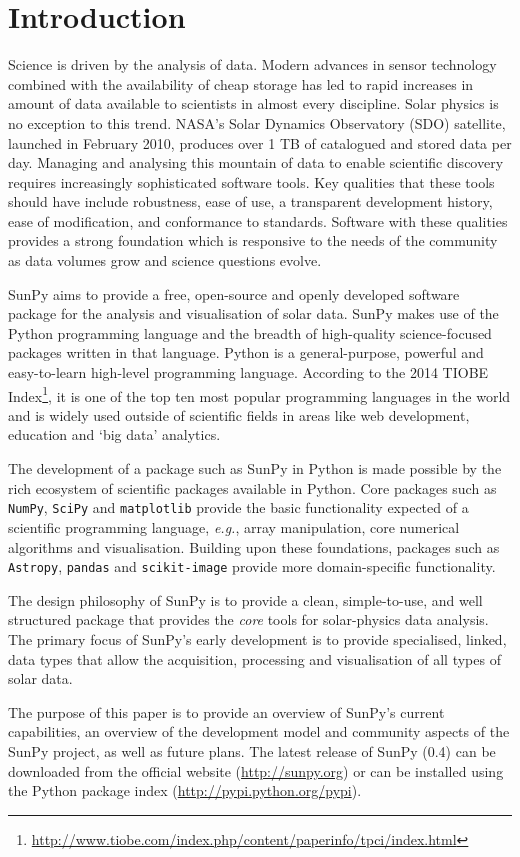\section{Introduction}\label{sec:Intro}

Science is driven by the analysis of data. Modern advances in sensor
technology combined with the availability of cheap storage has led to
rapid increases in amount of data available to scientists in almost
every discipline.  Solar physics is no exception to this trend. NASA's
Solar Dynamics Observatory (SDO) satellite, launched in February 2010,
produces over 1 TB of catalogued and stored data per day. Managing and
analysing this mountain of data to enable scientific discovery
requires increasingly sophisticated software tools.  Key qualities
that these tools should have include robustness, ease of use, a
transparent development history, ease of modification, and conformance
to standards.  Software with these qualities provides a strong
foundation which is responsive to the needs of the community as data
volumes grow and science questions evolve.

SunPy aims to provide a free, open-source and openly developed software package 
for the analysis and visualisation of solar data. SunPy makes use of the Python 
programming language and the breadth of high-quality science-focused packages 
written in that language. Python is a general-purpose, 
powerful and easy-to-learn high-level programming language.
According to the 
2014 TIOBE Index\footnote{\url{http://www.tiobe.com/index.php/content/paperinfo/tpci/index.html}},
 it is one of the top ten most popular programming languages in the world 
and is widely used outside of scientific fields in areas like web development, education 
and `big data' analytics.

The development of a package such as SunPy in Python is made possible by the 
rich ecosystem of scientific packages available in Python. Core packages such as \texttt{NumPy}, \texttt{SciPy} and \texttt{matplotlib} 
provide the basic functionality expected of a scientific programming language,
\textit{e.g.}, array manipulation, core numerical algorithms and visualisation. 
Building upon these foundations, packages such as \texttt{Astropy}, \texttt{pandas} and 
\texttt{scikit-image} provide more domain-specific functionality.

The design philosophy of SunPy is to provide a clean, simple-to-use, and well 
structured package that provides the \textit{core} tools for solar-physics data analysis. The 
primary focus of SunPy's early development is to provide specialised, linked, 
data types that allow the acquisition, processing and visualisation of all types 
of solar data.

The purpose of this paper is to provide an overview of SunPy's current 
capabilities, an overview of the development model and community aspects of the 
SunPy project, as well as future plans. The latest release of SunPy (0.4)
can be downloaded from
the official website (\url{http://sunpy.org}) or can be installed using 
the Python package index (\mbox{\url{http://pypi.python.org/pypi}}).
